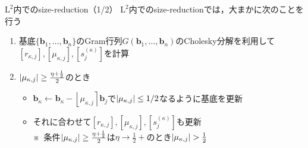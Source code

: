 \documentclass[12pt,aspectratio=169,table,dvipdfmx, leqno]{beamer}
\newcommand{\round}[1]{\left\lfloor #1 \right\rceil}
\begin{document}
\begin{frame}{$\text{L}^2$内でのsize-reduction（1/2）}
$\text{L}^2$内でのsize-reductionでは，大まかに次のことを行う
\begin{enumerate}
    \item 基底$\{\bm{b}_1,\ldots,\bm{b}_n\}$のGram行列$G(\bm{b}_1,\ldots,\bm{b}_n)$のCholesky分解を利用して$[r_{\kappa, j}], [\mu_{\kappa, j}], [s_j^{(\kappa)}]$を計算
    \item $\abs{\mu_{\kappa, j}}\ge \frac{\eta+\frac{1}{2}}{2}$のとき
    \begin{itemize}
        \item $\bm{b}_\kappa\gets \bm{b}_\kappa-\round{\mu_{\kappa, j}}\bm{b}_j$で$\abs{\mu_{\kappa, j}}\le 1/2$なるように基底を更新
        \item それに合わせて$[r_{\kappa, j}], [\mu_{\kappa, j}], [s_j^{(\kappa)}]$も更新\\
        \quad\quad\quad※~条件$\abs{\mu_{\kappa, j}}\ge \frac{\eta+\frac{1}{2}}{2}$は$\eta\to\frac{1}{2}+$のとき$\abs{\mu_{\kappa, j}}> \frac{1}{2}$ 
    \end{itemize}
\end{enumerate}
\end{frame}
\end{document}
